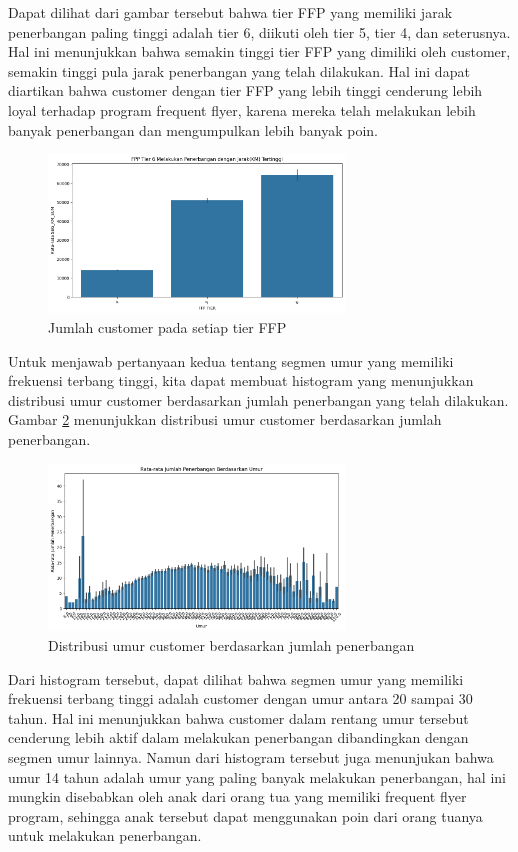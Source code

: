 Dapat dilihat dari gambar tersebut bahwa tier FFP yang memiliki jarak penerbangan paling tinggi adalah tier 6, diikuti oleh tier 5, tier 4, dan seterusnya. Hal ini menunjukkan bahwa semakin tinggi tier FFP yang dimiliki oleh customer, semakin tinggi pula jarak penerbangan yang telah dilakukan. Hal ini dapat diartikan bahwa customer dengan tier FFP yang lebih tinggi cenderung lebih loyal terhadap program frequent flyer, karena mereka telah melakukan lebih banyak penerbangan dan mengumpulkan lebih banyak poin.

\begin{figure}[H]
    \centering
    \includegraphics[width=0.7\textwidth]{gambar/fpp1.png}
    \caption{Jumlah customer pada setiap tier FFP}
    \label{fig:ffp_tier}
\end{figure}

Untuk menjawab pertanyaan kedua tentang segmen umur yang memiliki frekuensi terbang tinggi, kita dapat membuat histogram yang menunjukkan distribusi umur customer berdasarkan jumlah penerbangan yang telah dilakukan. Gambar \ref{fig:age_flight_count} menunjukkan distribusi umur customer berdasarkan jumlah penerbangan.

\begin{figure}[H]
    \centering
    \includegraphics[width=0.7\textwidth]{gambar/umur.png}
    \caption{Distribusi umur customer berdasarkan jumlah penerbangan}
    \label{fig:age_flight_count}
\end{figure}

Dari histogram tersebut, dapat dilihat bahwa segmen umur yang memiliki frekuensi terbang tinggi adalah customer dengan umur antara 20 sampai 30 tahun. Hal ini menunjukkan bahwa customer dalam rentang umur tersebut cenderung lebih aktif dalam melakukan penerbangan dibandingkan dengan segmen umur lainnya. Namun dari histogram tersebut juga menunjukan bahwa umur 14 tahun adalah umur yang paling banyak melakukan penerbangan, hal ini mungkin disebabkan oleh anak dari orang tua yang memiliki frequent flyer program, sehingga anak tersebut dapat menggunakan poin dari orang tuanya untuk melakukan penerbangan.

